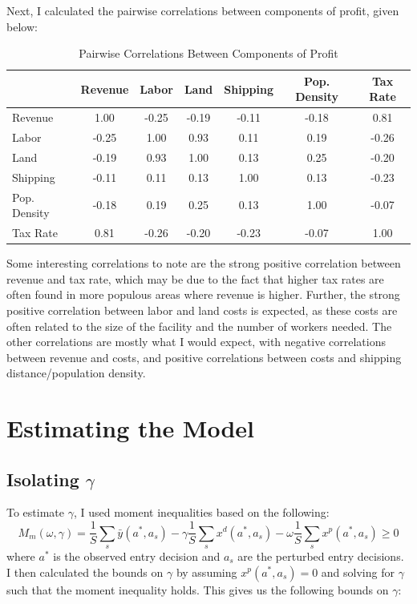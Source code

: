 \documentclass[11pt]{article}
\theoremstyle{definition}
\theoremstyle{remark}
\begin{document}
Next, I calculated the pairwise correlations between components of profit, given below:

\begin{table}[H]
\centering
\begin{tabular}{lcccccc}
\toprule
 & Revenue & Labor & Land & Shipping & Pop. Density & Tax Rate \\
\midrule
  Revenue & 1.00 & -0.25 & -0.19 & -0.11 & -0.18 & 0.81 \\
  Labor & -0.25 & 1.00 & 0.93 & 0.11 & 0.19 & -0.26 \\
  Land & -0.19 & 0.93 & 1.00 & 0.13 & 0.25 & -0.20 \\
  Shipping & -0.11 & 0.11 & 0.13 & 1.00 & 0.13 & -0.23 \\
  Pop. Density & -0.18 & 0.19 & 0.25 & 0.13 & 1.00 & -0.07 \\
  Tax Rate & 0.81 & -0.26 & -0.20 & -0.23 & -0.07 & 1.00 \\
\bottomrule
\end{tabular}
\caption{Pairwise Correlations Between Components of Profit}
\end{table}

Some interesting correlations to note are the strong positive correlation between revenue and tax rate, which may be due to the fact that higher tax rates are often found in more populous areas where revenue is higher. Further, the strong positive correlation between labor and land costs is expected, as these costs are often related to the size of the facility and the number of workers needed. The other correlations are mostly what I would expect, with negative correlations between revenue and costs, and positive correlations between costs and shipping distance/population density.

\section{Estimating the Model}

\subsection{Isolating $\gamma$}

To estimate $\gamma$, I used moment inequalities based on the following:
\begin{equation}
  M_m(\omega,\gamma) = \frac{1}{S}\sum_s\bar{y}(a^*,a_s) - \gamma\frac{1}{S}\sum_sx^d(a^*,a_s) - \omega\frac{1}{S}\sum_sx^p(a^*,a_s) \geq 0             
\end{equation}
where $a^*$ is the observed entry decision and $a_s$ are the perturbed entry decisions. I then calculated the bounds on $\gamma$ by assuming $x^p(a^*,a_s) = 0$ and solving for $\gamma$ such that the moment inequality holds. This gives us the following bounds on $\gamma$:
\end{document}
